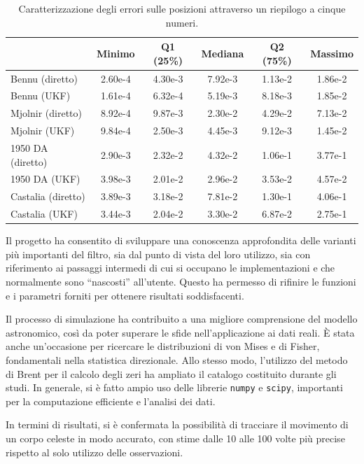\documentclass[12pt,a4paper,openright,twoside]{book}
\begin{document}
\begin{table}
\begin{tabular*}{\textwidth}{@{\extracolsep{\fill}}lccccc@{}}
                   & Minimo  & Q1 (25\%) & Mediana & Q2 (75\%) & Massimo \\\toprule
Bennu (diretto)    & 2.60e-4 & 4.30e-3 & 7.92e-3 & 1.13e-2 & 1.86e-2 \\
Bennu (UKF)        & 1.61e-4 & 6.32e-4 & 5.19e-3 & 8.18e-3 & 1.85e-2 \\\midrule
Mjolnir (diretto)  & 8.92e-4 & 9.87e-3 & 2.30e-2 & 4.29e-2 & 7.13e-2 \\
Mjolnir (UKF)      & 9.84e-4 & 2.50e-3 & 4.45e-3 & 9.12e-3 & 1.45e-2 \\\midrule
1950 DA (diretto)  & 2.90e-3 & 2.32e-2 & 4.32e-2 & 1.06e-1 & 3.77e-1 \\
1950 DA (UKF)      & 3.98e-3 & 2.01e-2 & 2.96e-2 & 3.53e-2 & 4.57e-2 \\\midrule
Castalia (diretto) & 3.89e-3 & 3.18e-2 & 7.81e-2 & 1.30e-1 & 4.06e-1 \\
Castalia (UKF)     & 3.44e-3 & 2.04e-2 & 3.30e-2 & 6.87e-2 & 2.75e-1 \\\midrule
\end{tabular*}
\caption{Caratterizzazione degli errori sulle posizioni attraverso un riepilogo a cinque numeri.}
\label{tab:results}
\end{table}


Il progetto ha consentito di sviluppare una conoscenza approfondita delle varianti più importanti del filtro, sia dal punto di vista del loro utilizzo, sia con riferimento ai passaggi intermedi di cui si occupano le implementazioni e che normalmente sono ``nascosti'' all'utente. Questo ha permesso di rifinire le funzioni e i parametri forniti per ottenere risultati soddisfacenti.

Il processo di simulazione ha contribuito a una migliore comprensione del modello astronomico, così da poter superare le sfide nell'applicazione ai dati reali. È stata anche un'occasione per ricercare le distribuzioni di von Mises e di Fisher, fondamentali nella statistica direzionale. Allo stesso modo, l'utilizzo del metodo di Brent per il calcolo degli zeri ha ampliato il catalogo costituito durante gli studi. In generale, si è fatto ampio uso delle librerie \lstinline{numpy} e \lstinline{scipy}, importanti per la computazione efficiente e l'analisi dei dati.

In termini di risultati, si è confermata la possibilità di tracciare il movimento di un corpo celeste in modo accurato, con stime dalle 10 alle 100 volte più precise rispetto al solo utilizzo delle osservazioni.
\end{document}
